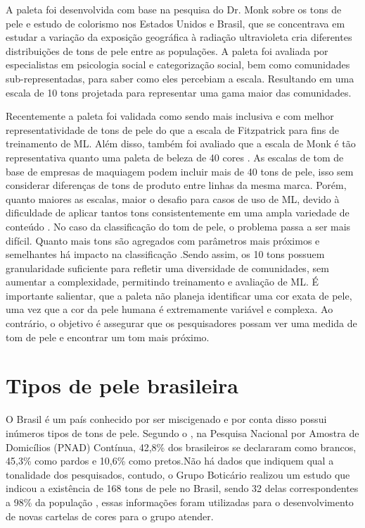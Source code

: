 A paleta foi desenvolvida com base na pesquisa do Dr. Monk sobre os tons de pele e estudo de colorismo nos Estados Unidos e Brasil, que se concentrava em estudar a variação da exposição geográfica à radiação ultravioleta cria diferentes distribuições de tons de pele entre as populações. A paleta foi avaliada por especialistas em psicologia social e categorização social, bem como comunidades sub-representadas, para saber como eles percebiam a escala. Resultando em uma escala de 10 tons projetada para representar uma gama maior das comunidades.

Recentemente a paleta foi validada como sendo mais inclusiva e com melhor representatividade de tons de pele do que a escala de Fitzpatrick para fins de treinamento de ML. Além disso, também foi avaliado que a escala de Monk é tão representativa quanto uma paleta de beleza de 40 cores \cite{Monk_2019}. As escalas de tom de base de empresas de maquiagem podem incluir mais de 40 tons de pele, isso sem considerar diferenças de tons de produto entre linhas da mesma marca. Porém, quanto maiores as escalas, maior o desafio para casos de uso de ML, devido à dificuldade de aplicar tantos tons consistentemente em uma ampla variedade de conteúdo \cite{Monk_2019}. No caso da classificação do tom de pele, o problema passa a ser mais difícil. Quanto mais tons são agregados com parâmetros mais próximos e semelhantes há impacto na classificação \cite{Automatic_Skin_Tone_Extraction_for_Visagism_Applications}.Sendo assim, os 10 tons possuem granularidade suficiente para refletir uma diversidade de comunidades, sem aumentar a complexidade, permitindo treinamento e avaliação de ML. É importante salientar, que a paleta não planeja identificar uma cor exata de pele, uma vez que a cor da pele humana é extremamente variável e complexa. Ao contrário, o objetivo é assegurar que os pesquisadores possam ver uma medida de tom de pele e encontrar um tom mais próximo.

\section{Tipos de pele brasileira}
O Brasil é um país conhecido por ser miscigenado e por conta disso possui inúmeros tipos de tons de pele. Segundo o \cite{ibge_2022}, na Pesquisa Nacional por Amostra de Domicílios (PNAD) Contínua, 42,8\% dos brasileiros se declararam como brancos, 45,3\% como pardos e 10,6\% como pretos.Não há dados que indiquem qual a tonalidade dos pesquisados, contudo, o Grupo Boticário realizou um estudo que indicou a existência de 168 tons de pele no Brasil, sendo 32 delas correspondentes a 98\% da população \cite{168_tons}, essas informações foram utilizadas para o desenvolvimento de novas cartelas de cores para o grupo atender. 


